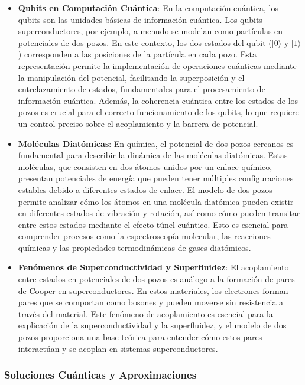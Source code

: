 \documentclass[a4paper,12pt]{article}
\begin{document}
\begin{itemize}
    \item \textbf{Qubits en Computación Cuántica}: 
    En la computación cuántica, los qubits son las unidades básicas de información cuántica. Los qubits superconductores, por ejemplo, a menudo se modelan como partículas en potenciales de dos pozos. En este contexto, los dos estados del qubit (\(|0\rangle\) y \(|1\rangle\)) corresponden a las posiciones de la partícula en cada pozo. Esta representación permite la implementación de operaciones cuánticas mediante la manipulación del potencial, facilitando la superposición y el entrelazamiento de estados, fundamentales para el procesamiento de información cuántica. Además, la coherencia cuántica entre los estados de los pozos es crucial para el correcto funcionamiento de los qubits, lo que requiere un control preciso sobre el acoplamiento y la barrera de potencial.
    
    \item \textbf{Moléculas Diatómicas}: 
    En química, el potencial de dos pozos cercanos es fundamental para describir la dinámica de las moléculas diatómicas. Estas moléculas, que consisten en dos átomos unidos por un enlace químico, presentan potenciales de energía que pueden tener múltiples configuraciones estables debido a diferentes estados de enlace. El modelo de dos pozos permite analizar cómo los átomos en una molécula diatómica pueden existir en diferentes estados de vibración y rotación, así como cómo pueden transitar entre estos estados mediante el efecto túnel cuántico. Esto es esencial para comprender procesos como la espectroscopía molecular, las reacciones químicas y las propiedades termodinámicas de gases diatómicos.
    
    \item \textbf{Fenómenos de Superconductividad y Superfluidez}: 
    El acoplamiento entre estados en potenciales de dos pozos es análogo a la formación de pares de Cooper en superconductores. En estos materiales, los electrones forman pares que se comportan como bosones y pueden moverse sin resistencia a través del material. Este fenómeno de acoplamiento es esencial para la explicación de la superconductividad y la superfluidez, y el modelo de dos pozos proporciona una base teórica para entender cómo estos pares interactúan y se acoplan en sistemas superconductores.
    
\end{itemize}

\subsubsection{Soluciones Cuánticas y Aproximaciones}
\end{document}
